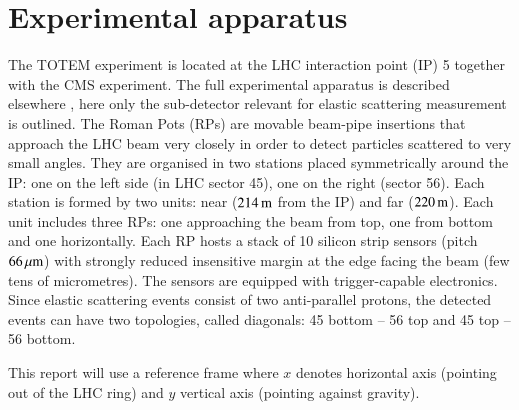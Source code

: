 \section{Experimental apparatus}

The TOTEM experiment is located at the LHC interaction point (IP) 5 together with the CMS experiment. The full experimental apparatus is described elsewhere \cite{totem-jinst}, here only the sub-detector relevant for elastic scattering measurement is outlined. The Roman Pots (RPs) are movable beam-pipe
insertions that approach the LHC beam very closely in order to detect particles scattered to very small angles. They are organised in two stations placed symmetrically around the IP: one on the left side (in LHC sector 45), one on the right (sector 56). Each station is formed by two units: near ($214\,{\rm m}$ from the IP) and far ($220\,{\rm m}$). Each unit includes three RPs: one approaching the beam from top, one from bottom and one horizontally. Each RP hosts a stack of 10 silicon strip sensors (pitch $66\,{\rm \mu m}$) with strongly reduced insensitive margin at the edge facing the beam (few tens of micrometres). The sensors are equipped with trigger-capable electronics. Since elastic scattering events consist of two anti-parallel protons, the detected events can have two topologies, called diagonals: 45 bottom -- 56 top and 45 top -- 56 bottom.

This report will use a reference frame where $x$ denotes horizontal axis (pointing out of the LHC ring) and $y$ vertical axis (pointing against gravity).
